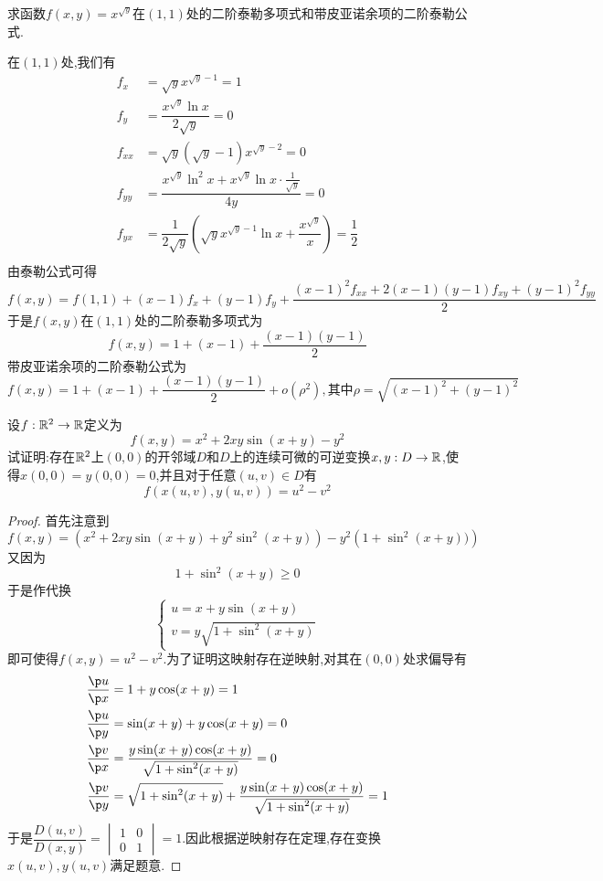 \documentclass{ctexart}
\begin{document}
\begin{problem}[5.(15\songti{分})]
    求函数$f(x,y)=x^{\sqrt{y}}$在$(1,1)$处的二阶泰勒多项式和带皮亚诺余项的二阶泰勒公式.
\end{problem}
\begin{solution}
    在$(1,1)$处,我们有
    \[\begin{aligned}
        f_x&=\sqrt{y}x^{\sqrt{y}-1}=1 \\
        f_y&=\dfrac{x^{\sqrt{y}}\ln x}{2\sqrt{y}}=0 \\
        f_{xx}&=\sqrt{y}\left(\sqrt{y}-1\right)x^{\sqrt{y}-2}=0 \\
        f_{yy}&=\dfrac{x^{\sqrt{y}}\ln^2x+x^{\sqrt{y}}\ln x\cdot\frac{1}{\sqrt{y}}}{4y}=0 \\
        f_{yx}&=\dfrac{1}{2\sqrt{y}}\left(\sqrt{y}x^{\sqrt{y}-1}\ln x+\dfrac{x^{\sqrt{y}}}{x}\right)=\dfrac12 \\
    \end{aligned}\]
    由泰勒公式可得
    \[f(x,y)=f(1,1)+(x-1)f_x+(y-1)f_y+\dfrac{(x-1)^2f_{xx}+2(x-1)(y-1)f_{xy}+(y-1)^2f_{yy}}{2}\]
    于是$f(x,y)$在$(1,1)$处的二阶泰勒多项式为
    \[f(x,y)=1+(x-1)+\dfrac{(x-1)(y-1)}{2}\]
    带皮亚诺余项的二阶泰勒公式为
    \[f(x,y)=1+(x-1)+\dfrac{(x-1)(y-1)}{2}+o(\rho^2),\text{其中}\rho=\sqrt{(x-1)^2+(y-1)^2}\]
\end{solution}
\begin{problem}[6.(15\songti{分})]
    设$f:\mathbb{R}^2\to\mathbb{R}$定义为
    \[f(x,y)=x^2+2xy\sin(x+y)-y^2\]
    试证明:存在$\mathbb{R}^2$上$(0,0)$的开邻域$D$和$D$上的连续可微的可逆变换$x,y:D\to\mathbb{R}$,使得$x(0,0)=y(0,0)=0$,并且对于任意$(u,v)\in D$有
    \[f(x(u,v),y(u,v))=u^2-v^2\]
\end{problem}
\begin{proof}
    首先注意到
    \[f(x,y)=\left(x^2+2xy\sin(x+y)+y^2\sin^2(x+y)\right)-y^2\left(1+\sin^2(x+y))\right)\]
    又因为\[1+\sin^2(x+y)\geqslant0\]
    于是作代换
    \[\left\{\begin{array}{l}
        u=x+y\sin(x+y) \\
        v=y\sqrt{1+\sin^2(x+y)}
    \end{array}\right.\]
    即可使得$f(x,y)=u^2-v^2$.为了证明这映射存在逆映射,对其在$(0,0)$处求偏导有
    \[\begin{aligned}
        \dfrac{\p u}{\p x}&=1+y\cos(x+y)=1\\
        \dfrac{\p u}{\p y}&=\sin(x+y)+y\cos(x+y)=0\\
        \dfrac{\p v}{\p x}&=\dfrac{y\sin(x+y)\cos(x+y)}{\sqrt{1+\sin^2(x+y)}}=0\\
        \dfrac{\p v}{\p y}&=\sqrt{1+\sin^2(x+y)}+\dfrac{y\sin(x+y)\cos(x+y)}{\sqrt{1+\sin^2(x+y)}}=1
    \end{aligned}\]
    于是$\dfrac{D(u,v)}{D(x,y)}=\begin{vmatrix}
        1&0\\0&1
    \end{vmatrix}=1$.因此根据逆映射存在定理,存在变换$x(u,v),y(u,v)$满足题意.
\end{proof}
\end{document}

